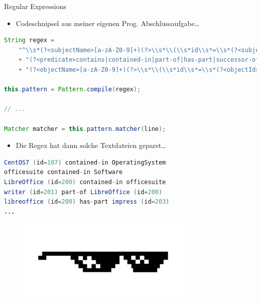 \documentclass[18pt]{beamer}
\begin{document}
\begin{frame}[fragile]{Regular Expressions}
    \begin{itemize}
        \item Codeschnipsel aus meiner eigenen Prog. Abschlussaufgabe\dots
    \end{itemize}
    \begin{lstlisting}[language=Java,basicstyle=\tiny]
String regex =
    "^\\s*(?<subjectName>[a-zA-Z0-9]+)(?>\\s*\\(\\s*id\\s*=\\s*(?<subjectId>[0-9]+)\\s*\\))?\\s+"
    + "(?<predicate>contains|contained-in|part-of|has-part|successor-of|predecessor-of)\\s+"
    + "(?<objectName>[a-zA-Z0-9]+)(?>\\s*\\(\\s*id\\s*=\\s*(?<objectId>[0-9]+)\\s*\\))?\\s*$";

this.pattern = Pattern.compile(regex);

// ...

Matcher matcher = this.pattern.matcher(line);
    \end{lstlisting}

\begin{itemize}
    \item Die Regex hat dann solche Textdateien geparst\dots
\end{itemize}

    \begin{lstlisting}[language=Java,basicstyle=\tiny]
CentOS7 (id=107) contained-in OperatingSystem
officesuite contained-in Software
LibreOffice (id=200) contained-in officesuite
writer (id=201) part-of LibreOffice (id=200)
libreoffice (id=200) has-part impress (id=203)
...
    \end{lstlisting}




    \begin{figure}
        \includegraphics[scale=.1]{img/dealwithit.jpg}
    \end{figure}

\end{frame}
\end{document}

